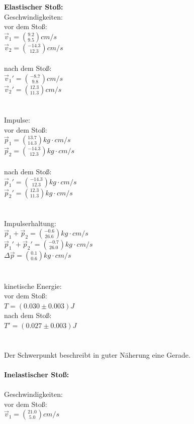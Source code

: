 \documentclass[12pt,a4paper]{article}
\begin{document}
\begin{multicols}{2}

\noindent \textbf{Elastischer Stoß:}\\

\noindent Geschwindigkeiten:\\
vor dem Stoß:\\
$\vec v_1 =\binom{9.2}{9.5} cm/s$\\

$\vec v_2 =\binom{-14.3}{12.3} cm/s$\\
\\
nach dem Stoß:\\
$\vec v_1' =\binom{-8.7}{9.8} cm/s$\\
$\vec v_2 '=\binom{12.3}{11.3} cm/s$\\
\\
\\
Impulse:\\
vor dem Stoß:\\
$\vec p_1 =\binom{13.7}{14.3} kg\cdot cm/s$\\
$\vec p_2 =\binom{-14.3}{12.3} kg\cdot cm/s$\\
\\
nach dem Stoß:\\
$\vec p_1' =\binom{-14.3}{12.3} kg\cdot cm/s$\\
$\vec p_2 '=\binom{12.3}{11.3} kg\cdot cm/s$\\
\\
\\
Impulserhaltung:\\
$\vec p_1 + \vec p_2 = \binom{-0.6}{26.6} kg\cdot cm/s$\\
$\vec p_1' + \vec p_2' = \binom{-0.7}{26.0} kg\cdot cm/s$\\
$\Delta \vec p =  \binom{0.1}{0.6} kg\cdot cm/s$\\
\\
\\
kinetische Energie:\\
vor dem Stoß:\\
$T = (0.030 \pm 0.003) J$\\
nach dem Stoß:\\
$T'=(0.027 \pm 0.003) J$\\
\\
\\
Der Schwerpunkt beschreibt in guter Näherung eine Gerade.\\
\\
\textbf{Inelastischer Stoß:}\\
\\
\noindent Geschwindigkeiten:\\
vor dem Stoß:\\
$\vec v_1 =\binom{21.0}{5.0} cm/s$\\


\end{multicols}
\end{document}
